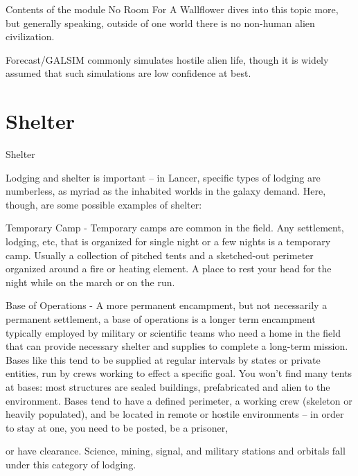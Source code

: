 Contents of the module No Room For A Wallflower dives into this topic more, but generally  
speaking, outside of one world there is no non-human alien civilization. 
 

Forecast/GALSIM commonly simulates hostile alien life, though it is widely assumed that such  
simulations are low confidence at best. 
 
\section{Shelter}
Shelter  

Lodging and shelter is important -- in Lancer, specific types of lodging are numberless, as myriad  
as the inhabited worlds in the galaxy demand. Here, though, are some possible examples of  
shelter: 
 

Temporary Camp - Temporary camps are common in the field. Any settlement, lodging, etc, that  
is organized for single night or a few nights is a temporary camp. Usually a collection of pitched  
tents and a sketched-out perimeter organized around a fire or heating element. A place to rest  
your head for the night while on the march or on the run.  
 

Base of Operations - A more permanent encampment, but not necessarily a permanent  
settlement, a base of operations is a longer term encampment typically employed by military or  
scientific teams who need a home in the field that can provide necessary shelter and supplies to  
complete a long-term mission. Bases like this tend to be supplied at regular intervals by states or  
private entities, run by crews working to effect a specific goal. You won’t find many tents at  
bases: most structures are sealed buildings, prefabricated and alien to the environment. Bases  
tend to have a defined perimeter, a working crew (skeleton or heavily populated), and be located  
in remote or hostile environments -- in order to stay at one, you need to be posted, be a prisoner,  

                                                                                                              


or have clearance. Science, mining, signal, and military stations and orbitals fall under this  
category of lodging.   
 

